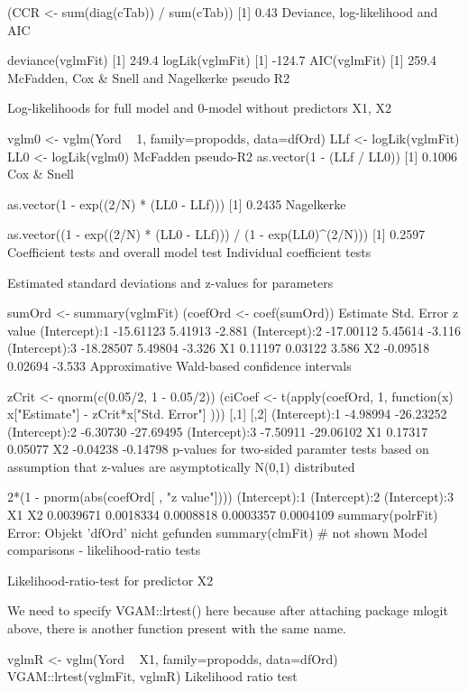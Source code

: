 (CCR <- sum(diag(cTab)) / sum(cTab))
[1] 0.43
Deviance, log-likelihood and AIC

deviance(vglmFit)
[1] 249.4
logLik(vglmFit)
[1] -124.7
AIC(vglmFit)
[1] 259.4
McFadden, Cox & Snell and Nagelkerke pseudo R2

Log-likelihoods for full model and 0-model without predictors X1, X2

vglm0 <- vglm(Yord ~ 1, family=propodds, data=dfOrd)
LLf   <- logLik(vglmFit)
LL0   <- logLik(vglm0)
McFadden pseudo-R2
as.vector(1 - (LLf / LL0))
[1] 0.1006
Cox & Snell

as.vector(1 - exp((2/N) * (LL0 - LLf)))
[1] 0.2435
Nagelkerke

as.vector((1 - exp((2/N) * (LL0 - LLf))) / (1 - exp(LL0)^(2/N)))
[1] 0.2597
Coefficient tests and overall model test
Individual coefficient tests

Estimated standard deviations and z-values for parameters

sumOrd   <- summary(vglmFit)
(coefOrd <- coef(sumOrd))
               Estimate Std. Error z value
(Intercept):1 -15.61123    5.41913  -2.881
(Intercept):2 -17.00112    5.45614  -3.116
(Intercept):3 -18.28507    5.49804  -3.326
X1              0.11197    0.03122   3.586
X2             -0.09518    0.02694  -3.533
Approximative Wald-based confidence intervals

zCrit   <- qnorm(c(0.05/2, 1 - 0.05/2))
(ciCoef <- t(apply(coefOrd, 1, function(x) x["Estimate"] - zCrit*x["Std. Error"] )))
                  [,1]      [,2]
(Intercept):1 -4.98994 -26.23252
(Intercept):2 -6.30730 -27.69495
(Intercept):3 -7.50911 -29.06102
X1             0.17317   0.05077
X2            -0.04238  -0.14798
p-values for two-sided paramter tests based on assumption that z-values are asymptotically N(0,1) distributed

2*(1 - pnorm(abs(coefOrd[ , "z value"])))
(Intercept):1 (Intercept):2 (Intercept):3            X1            X2 
    0.0039671     0.0018334     0.0008818     0.0003357     0.0004109 
summary(polrFit)
Error: Objekt 'dfOrd' nicht gefunden
summary(clmFit)
# not shown
Model comparisons - likelihood-ratio tests

Likelihood-ratio-test for predictor X2

We need to specify VGAM::lrtest() here because after attaching package mlogit above, there is another function present with the same name.

vglmR <- vglm(Yord ~ X1, family=propodds, data=dfOrd)
VGAM::lrtest(vglmFit, vglmR)
Likelihood ratio test

